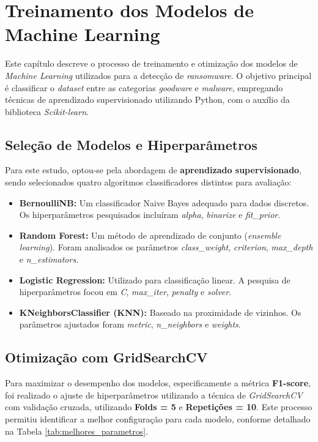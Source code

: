 
\section{Treinamento dos Modelos de Machine Learning} \label{sec:treinamento}

Este capítulo descreve o processo de treinamento e otimização dos modelos de \textit{Machine Learning} utilizados para a detecção de \textit{ransomware}. O objetivo principal é classificar o \textit{dataset} entre as categorias \textit{goodware} e \textit{malware}, empregando técnicas de aprendizado supervisionado utilizando  Python, com o auxílio da biblioteca \textit{Scikit-learn}.

\subsection{Seleção de Modelos e Hiperparâmetros}

Para este estudo, optou-se pela abordagem de \textbf{aprendizado supervisionado}, sendo selecionados quatro algoritmos classificadores distintos para avaliação:

\begin{itemize}
    \item \textbf{BernoulliNB:} Um classificador Naive Bayes adequado para dados discretos. Os hiperparâmetros pesquisados incluíram \textit{alpha}, \textit{binarize} e \textit{fit\_prior}.
    \item \textbf{Random Forest:} Um método de aprendizado de conjunto (\textit{ensemble learning}). Foram analisados os parâmetros \textit{class\_weight}, \textit{criterion}, \textit{max\_depth} e \textit{n\_estimators}.
    \item \textbf{Logistic Regression:} Utilizado para classificação linear. A pesquisa de hiperparâmetros focou em \textit{C}, \textit{max\_iter}, \textit{penalty} e \textit{solver}.
    \item \textbf{KNeighborsClassifier (KNN):} Baseado na proximidade de vizinhos. Os parâmetros ajustados foram \textit{metric}, \textit{n\_neighbors} e \textit{weights}.
\end{itemize}

\subsection{Otimização com GridSearchCV} \label{subsec:grid}

Para maximizar o desempenho dos modelos, especificamente a métrica \textbf{F1-score}, foi realizado o ajuste de hiperparâmetros utilizando a técnica de \textit{GridSearchCV} com validação cruzada, utilizando \textbf{Folds = 5} e \textbf{Repetições = 10}. Este processo permitiu identificar a melhor configuração para cada modelo, conforme detalhado na Tabela \ref{tab:melhores_parametros}.

